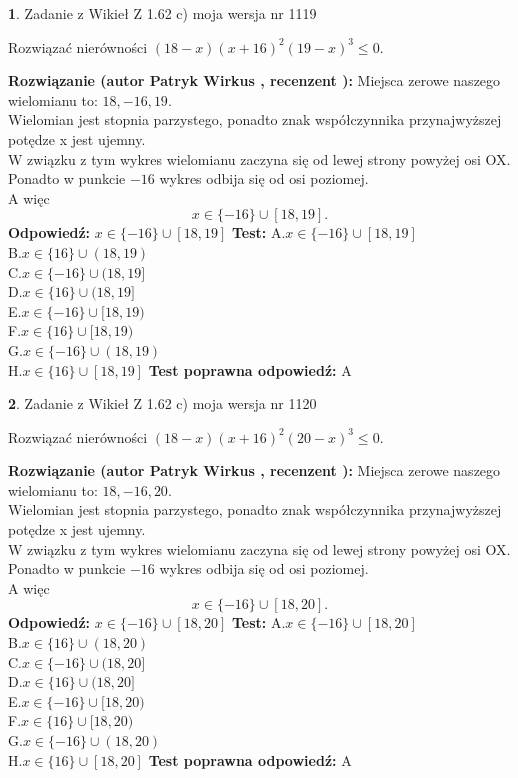 \documentclass[12pt, a4paper]{article}
\theoremstyle{definition} %
\newtheorem{zad}{}
\newcommand{\zadStart}[1]{\begin{zad}#1\newline}
\newcommand{\zadStop}{\end{zad}}
\newcommand{\rozwStart}[2]{\noindent \textbf{Rozwiązanie (autor #1 , recenzent #2): }\newline}
\newcommand{\rozwStop}{\newline}
\newcommand{\odpStart}{\noindent \textbf{Odpowiedź:}\newline}
\newcommand{\odpStop}{\newline}
\newcommand{\testStart}{\noindent \textbf{Test:}\newline}
\newcommand{\testStop}{\newline}
\newcommand{\kluczStart}{\noindent \textbf{Test poprawna odpowiedź:}\newline}
\newcommand{\kluczStop}{\newline}
\begin{document}
\zadStart{Zadanie z Wikieł Z 1.62 c) moja wersja nr 1119}

Rozwiązać nierówności $(18-x)(x+16)^{2}(19-x)^{3}\le0$.
\zadStop
\rozwStart{Patryk Wirkus}{}
Miejsca zerowe naszego wielomianu to: $18, -16, 19$.\\
Wielomian jest stopnia parzystego, ponadto znak współczynnika przy\linebreak najwyższej potędze x jest ujemny.\\ W związku z tym wykres wielomianu zaczyna się od lewej strony powyżej osi OX.\\
Ponadto w punkcie $-16$ wykres odbija się od osi poziomej.\\
A więc $$x \in \{-16\} \cup [18,19].$$
\rozwStop
\odpStart
$x \in \{-16\} \cup [18,19]$
\odpStop
\testStart
A.$x \in \{-16\} \cup [18,19]$\\
B.$x \in \{16\} \cup (18,19)$\\
C.$x \in \{-16\} \cup (18,19]$\\
D.$x \in \{16\} \cup (18,19]$\\
E.$x \in \{-16\} \cup [18,19)$\\
F.$x \in \{16\} \cup [18,19)$\\
G.$x \in \{-16\} \cup (18,19)$\\
H.$x \in \{16\} \cup [18,19]$
\testStop
\kluczStart
A
\kluczStop



\zadStart{Zadanie z Wikieł Z 1.62 c) moja wersja nr 1120}

Rozwiązać nierówności $(18-x)(x+16)^{2}(20-x)^{3}\le0$.
\zadStop
\rozwStart{Patryk Wirkus}{}
Miejsca zerowe naszego wielomianu to: $18, -16, 20$.\\
Wielomian jest stopnia parzystego, ponadto znak współczynnika przy\linebreak najwyższej potędze x jest ujemny.\\ W związku z tym wykres wielomianu zaczyna się od lewej strony powyżej osi OX.\\
Ponadto w punkcie $-16$ wykres odbija się od osi poziomej.\\
A więc $$x \in \{-16\} \cup [18,20].$$
\rozwStop
\odpStart
$x \in \{-16\} \cup [18,20]$
\odpStop
\testStart
A.$x \in \{-16\} \cup [18,20]$\\
B.$x \in \{16\} \cup (18,20)$\\
C.$x \in \{-16\} \cup (18,20]$\\
D.$x \in \{16\} \cup (18,20]$\\
E.$x \in \{-16\} \cup [18,20)$\\
F.$x \in \{16\} \cup [18,20)$\\
G.$x \in \{-16\} \cup (18,20)$\\
H.$x \in \{16\} \cup [18,20]$
\testStop
\kluczStart
A
\kluczStop
\end{document}
